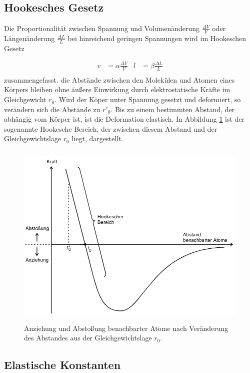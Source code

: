 \subsection{Hookesches Gesetz}

Die Proportionalität zwischen Spannung und Volumenänderung
$\frac{\Delta V}{V}$ oder
Längenänderung $\frac{\Delta L}{L}$ bei hinreichend geringen Spannungen
wird im Hookeschen Gesetz

\begin{align}
  v & = \alpha \frac{\Delta V}{V} & l & = \beta \frac{\Delta L}{L} \\
  \label{eqn:Hooke}
\end{align}
zusammengefasst.
die Abstände zwischen den Molekülen und Atomen eines Körpers bleiben ohne
äußere Einwirkung durch elektrostatische Kräfte im Gleichgewicht $r_0$.
Wird der Köper unter Spannung gesetzt und deformiert, so verändern sich die
Abstände zu $r'_0$.
Bis zu einem bestimmten Abstand, der abhängig vom Körper ist, ist die
Deformation elastisch.
In Abbildung \ref{fig:HookBe} ist der sogenannte Hookesche Bereich, der zwischen
diesem Abstand und der Gleichgewichtslage $r_0$ liegt, dargestellt.

\begin{figure}[h]
  \centering
  \includegraphics[height = 9cm]{HookescherBereich.png}
  \caption{Anziehung und Abstoßung benachbarter Atome nach Veränderung des
  Abstandes aus der Gleichgewichtslage $r_0$.}
  \label{fig:HookBe}
\end{figure}


\subsection{Elastische Konstanten}

